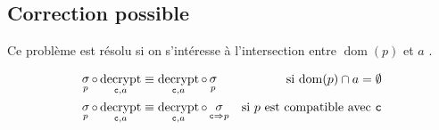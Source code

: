 \documentclass[french]{article}
\DeclareMathOperator{\sel}{\sigma}
\DeclareMathOperator{\decrypt}{decrypt}
\DeclareMathOperator{\dom}{dom}
\newcommand\typeT[1]{\text{\ttfamily #1}}
\newcommand{\decryptArgs}[2]{\decrypt_{\typeT{#1}, #2}}
\newcommand{\selP}{\sel_p}
\newcommand{\decryptCAlpha}{\decryptArgs{c}{a}}
\begin{document}
\subsection*{Correction possible}
Ce problème est résolu si on s'intéresse à l'intersection entre $\dom(p)$
et $a$ .

\begin{align*}
\selP \circ \decryptCAlpha 
& \equiv \decryptCAlpha \circ \selP
& \text{si $\dom(p) \cap a = \emptyset$} \\
\selP \circ \decryptCAlpha 
& \equiv \decryptCAlpha \circ \sel_{\typeT{c} \Rightarrow p}
& \text{si $p$  est compatible avec $\typeT{c}$} 
\end{align*}
\end{document}
